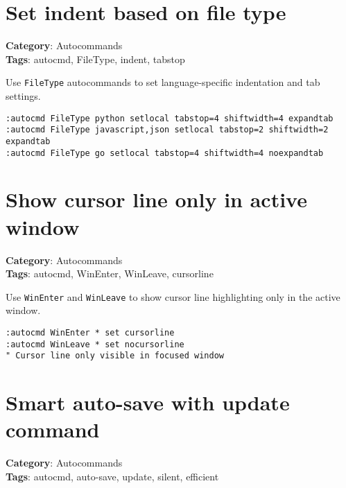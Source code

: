 \section{Set indent based on file type}

\textbf{Category}: Autocommands\\ \textbf{Tags}: autocmd, FileType, indent, tabstop
\vspace{0.5cm}

Use {\footnotesize \Verb§FileType§} autocommands to set language-specific indentation and tab settings.

\begin{Exa*}{}
\begin{Verbatim}[fontsize=\footnotesize, breaklines, breakanywhere]
:autocmd FileType python setlocal tabstop=4 shiftwidth=4 expandtab
:autocmd FileType javascript,json setlocal tabstop=2 shiftwidth=2 expandtab
:autocmd FileType go setlocal tabstop=4 shiftwidth=4 noexpandtab
\end{Verbatim}
\end{Exa*}

\section{Show cursor line only in active window}

\textbf{Category}: Autocommands\\ \textbf{Tags}: autocmd, WinEnter, WinLeave, cursorline
\vspace{0.5cm}

Use {\footnotesize \Verb§WinEnter§} and {\footnotesize \Verb§WinLeave§} to show cursor line highlighting only in the active window.

\begin{Exa*}{}
\begin{Verbatim}[fontsize=\footnotesize, breaklines, breakanywhere]
:autocmd WinEnter * set cursorline
:autocmd WinLeave * set nocursorline
" Cursor line only visible in focused window
\end{Verbatim}
\end{Exa*}

\section{Smart auto-save with update command}

\textbf{Category}: Autocommands\\ \textbf{Tags}: autocmd, auto-save, update, silent, efficient
\vspace{0.5cm}

